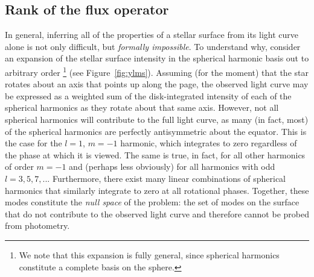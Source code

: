 \documentclass[modern]{aastex62}
\begin{document}
\subsection{Rank of the flux operator}
%
In general, inferring all of the properties of a stellar surface from its light curve alone
is not
only difficult, but \emph{formally impossible}. To understand why, consider
an expansion of the stellar surface intensity in the spherical
harmonic basis out to arbitrary order%
\footnote{%
    We note that this expansion is fully general, since spherical harmonics
    constitute a complete basis on the sphere.
} (see Figure~\ref{fig:ylms}).
Assuming (for the moment) that the
star rotates about an axis that points up along the page, the observed
light curve may be expressed as a weighted sum of the disk-integrated intensity
of each of the spherical harmonics as they rotate about that same axis.
However, not all spherical harmonics will contribute to the full light curve,
as many (in fact, most) of the spherical harmonics are perfectly antisymmetric
about the equator. This is the case for
the $l = 1$, $m = -1$ harmonic, which integrates to zero regardless of
the phase at which it is viewed. The same is true, in fact, for all other harmonics
of order $m = -1$ and (perhaps less obviously) for all harmonics with odd
$l = 3, 5, 7, ...$ Furthermore, there exist many linear combinations of
spherical harmonics that similarly integrate to zero at all rotational
phases. Together, these modes constitute the \emph{null space} of the problem:
the set of modes on the surface that do not contribute to the observed
light curve and therefore cannot be probed from photometry.
\end{document}
